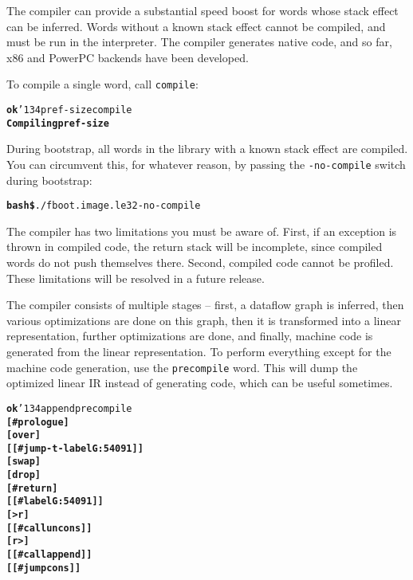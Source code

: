 \documentclass{report}
\newcommand{\bs}{\char'134}
\begin{document}
The compiler can provide a substantial speed boost for words whose stack effect can be inferred. Words without a known stack effect cannot be compiled, and must be run in the interpreter. The compiler generates native code, and so far, x86 and PowerPC backends have been developed.

To compile a single word, call \texttt{compile}:

\begin{alltt}
\textbf{ok} \bs pref-size compile
\textbf{Compiling pref-size}
\end{alltt}

During bootstrap, all words in the library with a known stack effect are compiled. You can
circumvent this, for whatever reason, by passing the \texttt{-no-compile} switch during
bootstrap:

\begin{alltt}
\textbf{bash\$} ./f boot.image.le32 -no-compile
\end{alltt}

The compiler has two limitations you must be aware of. First, if an exception is thrown in compiled code, the return stack will be incomplete, since compiled words do not push themselves there. Second, compiled code cannot be profiled. These limitations will be resolved in a future release.

The compiler consists of multiple stages -- first, a dataflow graph is inferred, then various optimizations are done on this graph, then it is transformed into a linear representation, further optimizations are done, and finally, machine code is generated from the linear representation. To perform everything except for the machine code generation, use the \texttt{precompile} word. This will dump the optimized linear IR instead of generating code, which can be useful sometimes.

\begin{alltt}
\textbf{ok} \bs append precompile
\textbf{[ \#prologue ]
[ over ]
[[ \#jump-t-label G:54091 ]]
[ swap ]
[ drop ]
[ \#return ]
[[ \#label G:54091 ]]
[ >r ]
[[ \#call uncons ]]
[ r> ]
[[ \#call append ]]
[[ \#jump cons ]]}
\end{alltt}

\printglossary


\end{document}
